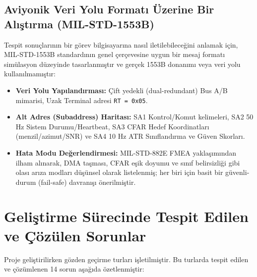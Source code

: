 \documentclass[11pt,a4paper]{article}
\begin{document}
\subsection{Aviyonik Veri Yolu Formatı Üzerine Bir Alıştırma (MIL-STD-1553B)}
Tespit sonuçlarının bir görev bilgisayarına nasıl iletilebileceğini anlamak için, MIL-STD-1553B standardının genel çerçevesine uygun bir mesaj formatı simülasyon düzeyinde tasarlanmıştır ve gerçek 1553B donanımı veya veri yolu kullanılmamıştır:
\begin{itemize}
    \item \textbf{Veri Yolu Yapılandırması:} Çift yedekli (dual-redundant) Bus A/B mimarisi, Uzak Terminal adresi \texttt{RT = 0x05}.
    \item \textbf{Alt Adres (Subaddress) Haritası:} SA1 Kontrol/Komut kelimeleri, SA2 50 Hz Sistem Durumu/Heartbeat, SA3 CFAR Hedef Koordinatları (menzil/azimut/SNR) ve SA4 10 Hz ATR Sınıflandırma ve Güven Skorları.
    \item \textbf{Hata Modu Değerlendirmesi:} MIL-STD-882E FMEA yaklaşımından ilham alınarak, DMA taşması, CFAR eşik doyumu ve sınıf belirsizliği gibi olası arıza modları düşünsel olarak listelenmiş; her biri için basit bir güvenli-durum (fail-safe) davranışı önerilmiştir. 
\end{itemize}

\section{Geliştirme Sürecinde Tespit Edilen ve Çözülen Sorunlar}

Proje geliştirilirken gözden geçirme turları işletilmiştir. Bu turlarda tespit edilen ve çözümlenen 14 sorun aşağıda özetlenmiştir:
\end{document}
